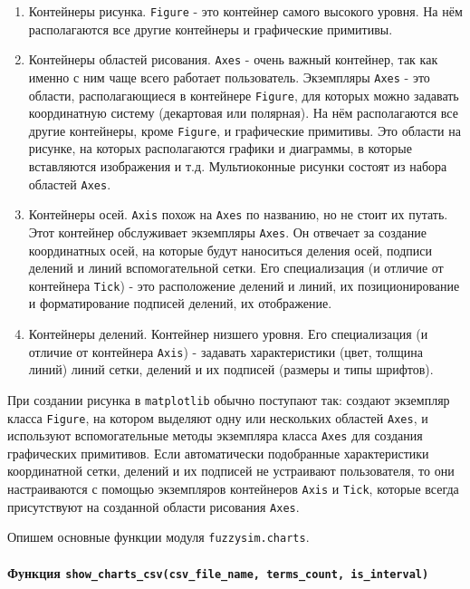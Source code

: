 \begin{enumerate}[label=\arabic*)]
	\item  Контейнеры рисунка. \lstinline!Figure! - это контейнер самого высокого уровня. На нём располагаются все другие контейнеры и графические примитивы.

	\item  Контейнеры областей рисования. \lstinline!Axes! - очень важный контейнер, так как именно с ним чаще всего работает пользователь. Экземпляры \lstinline!Axes! - это области, располагающиеся в контейнере \lstinline!Figure!, для которых можно задавать координатную систему (декартовая или полярная). На нём располагаются все другие контейнеры, кроме \lstinline!Figure!, и графические примитивы. Это области на рисунке, на которых располагаются графики и диаграммы, в которые вставляются изображения и т.д. Мультиоконные рисунки состоят из набора областей \lstinline!Axes!.

	\item  Контейнеры осей. \lstinline!Axis! похож на \lstinline!Axes! по названию, но не стоит их путать. Этот контейнер обслуживает экземпляры \lstinline!Axes!. Он отвечает за создание координатных осей, на которые будут наноситься деления осей, подписи делений и линий вспомогательной сетки. Его специализация (и отличие от контейнера \lstinline!Tick!) - это расположение делений и линий, их позиционирование и форматирование подписей делений, их отображение.

	\item  Контейнеры делений. Контейнер низшего уровня. Его специализация (и отличие от контейнера \lstinline!Axis!) - задавать характеристики (цвет, толщина линий) линий сетки, делений и их подписей (размеры и типы шрифтов).
\end{enumerate}

При создании рисунка в \lstinline!matplotlib! обычно поступают так: создают экземпляр класса \lstinline!Figure!, на котором выделяют одну или нескольких областей \lstinline!Axes!, и используют вспомогательные методы экземпляра класса \lstinline!Axes! для создания графических примитивов. Если автоматически подобранные характеристики координатной сетки, делений и их подписей не устраивают пользователя, то они настраиваются с помощью экземпляров контейнеров \lstinline!Axis! и \lstinline!Tick!, которые всегда присутствуют на созданной области рисования \lstinline!Axes!.

Опишем основные функции модуля \lstinline!fuzzysim.charts!.

\paragraph{Функция \lstinline!show_charts_csv(csv_file_name, terms_count, is_interval)!}

